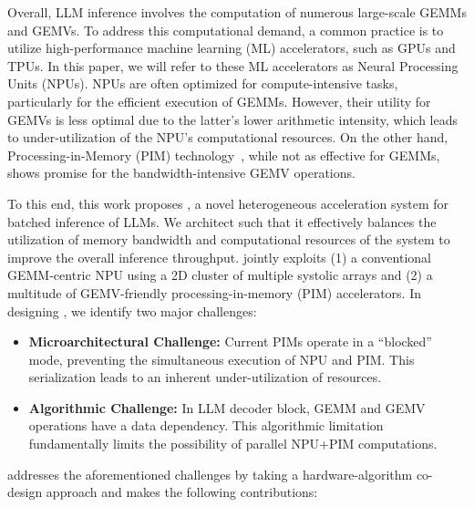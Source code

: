 %
Overall, LLM inference involves the computation of numerous large-scale GEMMs and GEMVs.
%
To address this computational demand, a common practice is to utilize high-performance machine learning (ML) accelerators, such as GPUs and TPUs. In this paper, we will refer to these ML accelerators as Neural Processing Units (NPUs).
%
NPUs are often optimized for compute-intensive tasks, particularly for the efficient execution of GEMMs. 
%
However, their utility for GEMVs is less optimal due to the latter's lower arithmetic intensity, which leads to under-utilization of the NPU's computational resources.
%
On the other hand, Processing-in-Memory (PIM) technology~\cite{9869326, 9912078, 9912072, 10.1145/3547353.3522661, 10.1145/3489048.3522661, 9771457,AttAcc, 9365862, hcs23-aquabolt-xl, 10.1145/3490422.3502355, hbm_pim,newton,tensor-dimm, RecNMP, SpaceA, gradpim, aespa,10.1145/3458817.3476146, 9474146, infstream, 9563039,computedram, dual-micro, floatpim, pimcloud, 7284059, recross,lpddr-gpt,pim-instr, graphpim, virtualpim, chameleon-pim, 9566881, heo2023primo, hyun2023pathfinding, jonatan2024scalability, micro21-trim}, while not as effective for GEMMs, shows promise for the bandwidth-intensive GEMV operations.


To this end, this work proposes \neupims, a novel heterogeneous acceleration system for batched inference of LLMs. 
%
We architect \neupims such that it effectively balances the utilization of memory bandwidth and computational resources of the system to improve the overall inference throughput.
%
\neupims jointly exploits (1) a conventional GEMM-centric NPU using a 2D cluster of multiple systolic arrays and (2) a multitude of GEMV-friendly processing-in-memory (PIM) accelerators. 
%
In designing \neupims, we identify two major challenges: 
%
\begin{itemize}[labelindent=0.1em,nolistsep,leftmargin=1em]
%
\item \textbf{Microarchitectural Challenge:} Current PIMs operate in a ``blocked'' mode, preventing the simultaneous execution of NPU and PIM. This serialization leads to an inherent under-utilization of resources.
%
\item \textbf{Algorithmic Challenge:} In LLM decoder block, GEMM and GEMV operations have a data dependency. This algorithmic limitation fundamentally limits the possibility of parallel NPU+PIM computations.
%
\end{itemize}


\neupims addresses the aforementioned challenges by taking a hardware-algorithm co-design approach and makes the following contributions:

